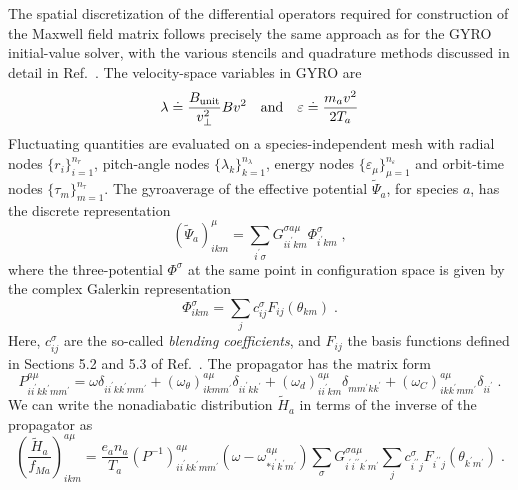 The spatial discretization of the differential operators 
required for construction of the Maxwell field matrix follows 
precisely the same approach as for the GYRO initial-value 
solver, with the various stencils and quadrature methods 
discussed in detail in Ref.~\cite{candy:2003}.  The velocity-space
variables in GYRO are 
%
\begin{equation}
\lambda \doteq \frac{B_{\rm unit}}{v_\perp^2}{B v^2} 
\quad\mbox{and}\quad
\varepsilon \doteq \frac{m_a v^2}{2 T_a}
\end{equation}
%
Fluctuating quantities are evaluated on a species-independent 
mesh with radial nodes $\{r_i\}_{i=1}^{n_r}$, pitch-angle nodes 
$\{\lambda_k\}_{k=1}^{n_\lambda}$, energy nodes 
$\{\varepsilon_\mu\}_{\mu=1}^{n_\varepsilon}$ and orbit-time nodes 
$\{\tau_m\}_{m=1}^{n_\tau}$.  The gyroaverage of the effective 
potential ${\widetilde\Psi}_a$, for species $a$, has the 
discrete representation
% 
\begin{equation}
({\widetilde\Psi}_a)_{ikm}^{\mu} =\sum_{i^\prime\sigma}G^{\sigma a \mu}_{ii^\prime km} 
\Phi^\sigma_{i^\prime km} \; ,
\end{equation}
%
where the three-potential $\Phi^\sigma$ at the same point 
in configuration space is given by the complex Galerkin 
representation
%
\begin{equation}
\Phi_{ikm}^\sigma = \sum_j c_{ij}^\sigma F_{ij}(\theta_{km}) \; .
\end{equation}
%
Here, $c_{ij}^\sigma$ are the so-called {\it blending coefficients},
and $F_{ij}$ the basis functions defined in Sections 5.2 and 
5.3 of Ref.~\cite{candy:2003}.  The propagator has the 
matrix form
%
\begin{equation}
P_{ii^\prime kk^\prime mm^\prime}^{a\mu} = 
\omega \delta_{ii^\prime kk^\prime mm^\prime} 
+ (\omega_\theta)_{ikmm^\prime}^{a\mu} \delta_{ii^\prime kk^\prime} 
+ (\omega_d)_{ii^\prime km}^{a\mu} \delta_{mm^\prime kk^\prime} 
+ (\omega_C)_{ikk^\prime mm^\prime}^{a\mu} \delta_{i i^\prime} \; .
\end{equation}
%
We can write the nonadiabatic distribution ${\widetilde H}_a$ in terms 
of the inverse of the propagator as
%
\begin{equation}
\left(\frac{{\widetilde H}_a}{f_{Ma}}\right)_{ikm}^{a\mu} = 
\frac{e_a n_a}{T_a}
(P^{-1})_{ii^\prime kk^\prime mm^\prime}^{a\mu} 
(\omega-\omega_{*i^\prime k^\prime m^\prime}^{a\mu})\sum_\sigma 
G_{i^\prime i^{\prime\prime} k^\prime m^\prime}^{\sigma a\mu} 
\sum_j c_{i^{\prime\prime} j}^\sigma 
F_{i^{\prime\prime} j} (\theta_{k^\prime m^\prime}) \; .
\end{equation}
